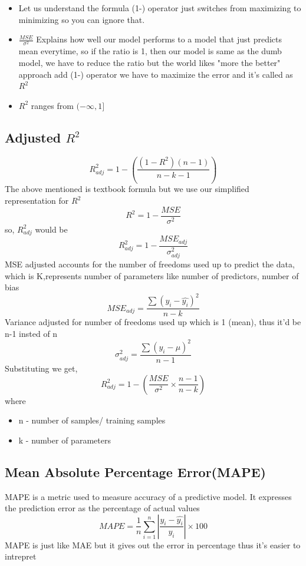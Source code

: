 \documentclass[12pt]{extarticle}
\begin{document}
\begin{itemize}
    \item Let us understand the formula (1-) operator just switches from maximizing to minimizing
so you can ignore that. \\
    \item \(\frac{MSE}{\sigma^2}\) Explains how well our model performs to a model that 
just predicts mean everytime, so if the ratio is 1, then our model is same as the dumb model,
we have to reduce the ratio but the world likes "more the better" approach 
add (1-) operator we have to maximize the error and it's called as \(R^2\) 
\item \(R^2\) ranges from \((-\infty,1]\)
\end{itemize}

\subsection{Adjusted \(R^2\)}
$$ R^2_{adj} = 1 - \left(\frac{(1-R^2)(n-1)}{n-k-1}\right) $$
The above mentioned is textbook formula but we use our simplified 
representation for \(R^2\)
$$ R^2 = 1 - \frac{MSE}{\sigma^2} $$
so, \(R^2_{adj}\) would be
$$ R^2_{adj} = 1 - \frac{MSE_{adj}}{\sigma^2_{adj}} $$
MSE adjusted accounts for the number of freedoms used up to predict the data, 
which is K,represents number of parameters like number of predictors, number of bias
$$ MSE_{adj} = \frac{\sum(y_i-\hat{y_i})^2}{n-k} $$
Variance adjusted for number of freedoms used up which is 1 (mean), 
thus it'd be n-1 insted of n
$$ \sigma^2_{adj} = \frac{\sum(y_i-\mu)^2}{n-1} $$
Substituting we get,
$$ R^2_{adj} = 1 - \left(\frac{MSE}{\sigma^2} \times \frac{n-1}{n-k}\right) $$
where 
\begin{itemize}
    \item n - number of samples/ training samples
    \item k - number of parameters
\end{itemize}

\subsection{Mean Absolute Percentage Error(MAPE)}
MAPE is a metric used to measure accuracy of a predictive model. It expresses the 
prediction error as the percentage of actual values
$$ MAPE = \frac{1}{n}\sum_{i=1}^{n}\left|\frac{y_i-\hat{y_i}}{y_i}\right| \times 100 $$
MAPE is just like MAE but it gives out the error in percentage thus it's easier to intrepret 
\end{document}
